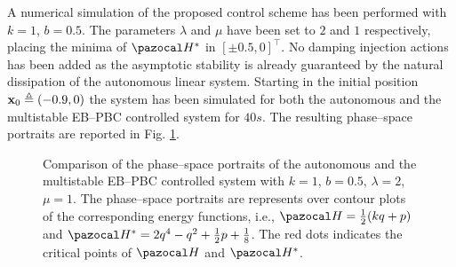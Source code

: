 A numerical simulation of the proposed control scheme has been performed with $k = 1$, $b = 0.5$. The parameters $\lambda$ and $\mu$ have been set to $2$ and $1$ respectively, placing the minima of $\Ha^*$ in $[\pm0.5,0]^\top$. No damping injection actions has been added as the asymptotic stability is already guaranteed by the natural dissipation of the autonomous linear system. Starting in the initial position $\mathbf{x}_0 \triangleq (-0.9,0)$ the system has been simulated for both the  autonomous and the multistable EB--PBC controlled system for $40s$. The resulting phase--space portraits are reported in Fig. \ref{fig:ctrl_ps}.
%
\begin{figure}[!ht]
    \centering
    
    \caption[Phase--space portraits of the autonomous and the multistable EB--PBC controlled system]{Comparison of the phase--space portraits of the autonomous and the multistable EB--PBC controlled system with $k = 1$, $b = 0.5$, $\lambda = 2$, $\mu = 1$. The phase--space portraits are represents over contour plots of the corresponding energy functions, i.e., $\Ha = \frac{1}{2}(kq + p)$ and  $\Ha^* =  2q^4 - q^2 + \frac{1}{2}p + \frac{1}{8}$. The red dots indicates the critical points of $\Ha$ and $\Ha^*$.}
    \label{fig:ctrl_ps}
\end{figure}
%
